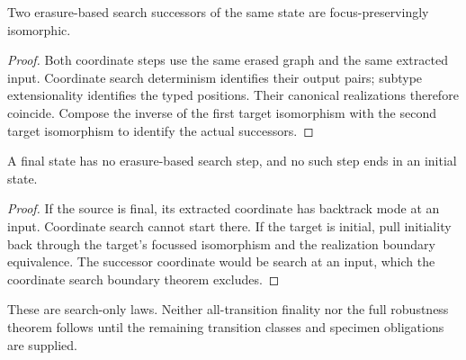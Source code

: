 \begin{theorem}
Two erasure-based search successors of the same state are focus-preservingly
isomorphic.
\end{theorem}
\begin{proof}
Both coordinate steps use the same erased graph and the same extracted input.
Coordinate search determinism identifies their output pairs; subtype
extensionality identifies the typed positions. Their canonical realizations
therefore coincide. Compose the inverse of the first target isomorphism with
the second target isomorphism to identify the actual successors.
\end{proof}

\begin{lemma}
A final state has no erasure-based search step, and no such step ends in an
initial state.
\end{lemma}
\begin{proof}
If the source is final, its extracted coordinate has backtrack mode at an
input. Coordinate search cannot start there. If the target is initial, pull
initiality back through the target's focussed isomorphism and the realization
boundary equivalence. The successor coordinate would be search at an input,
which the coordinate search boundary theorem excludes.
\end{proof}
These are search-only laws. Neither all-transition finality nor the full
robustness theorem follows until the remaining transition classes and specimen
obligations are supplied.

